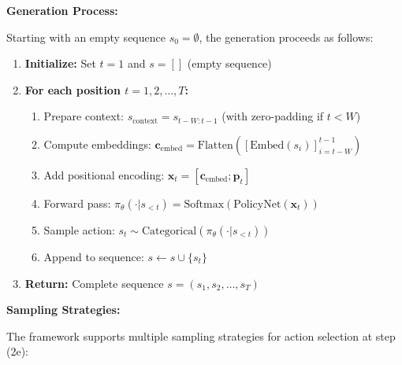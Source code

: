\documentclass[conference]{IEEEtran}
\begin{document}
\textbf{Generation Process:}

Starting with an empty sequence $s_0 = \emptyset$, the generation proceeds as follows:
\begin{enumerate}
    \item \textbf{Initialize:} Set $t = 1$ and $s = []$ (empty sequence)
    
    \item \textbf{For each position $t = 1, 2, \ldots, T$:}
    \begin{enumerate}
        \item Prepare context: $s_{\text{context}} = s_{t-W:t-1}$ (with zero-padding if $t < W$)
        \item Compute embeddings: $\mathbf{c}_{\text{embed}} = \text{Flatten}([\text{Embed}(s_i)]_{i=t-W}^{t-1})$
        \item Add positional encoding: $\mathbf{x}_t = [\mathbf{c}_{\text{embed}}; \mathbf{p}_t]$
        \item Forward pass: $\pi_\theta(\cdot | s_{<t}) = \text{Softmax}(\text{PolicyNet}(\mathbf{x}_t))$
        \item Sample action: $s_t \sim \text{Categorical}(\pi_\theta(\cdot | s_{<t}))$
        \item Append to sequence: $s \leftarrow s \cup \{s_t\}$
    \end{enumerate}
    
    \item \textbf{Return:} Complete sequence $s = (s_1, s_2, \ldots, s_T)$
\end{enumerate}

\textbf{Sampling Strategies:}

The framework supports multiple sampling strategies for action selection at step (2e):
\end{document}
